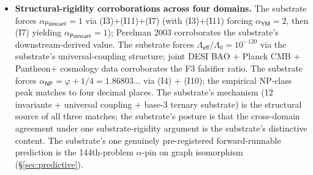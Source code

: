 \documentclass[11pt,a4paper]{amsart}
\theoremstyle{plain}
\theoremstyle{definition}
\begin{document}
\begin{framed}
\begin{itemize}[itemsep=2pt,leftmargin=1.4em]
\item \textbf{Structural-rigidity corroborations across four domains.} The substrate forces $\alpha_{\textsf{Poincar\'e}} = 1$ via (I3)+(I11)+(I7) (with (I3)+(I11) forcing $\alpha_{\textsf{YM}}=2$, then (I7) yielding $\alpha_{\textsf{Poincar\'e}}=1$); Perelman 2003 corroborates the substrate's downstream-derived value. The substrate forces $\Lambda_{\textsf{eff}}/\Lambda_0 = 10^{-120}$ via the substrate's universal-coupling structure; joint DESI BAO + Planck CMB + Pantheon$+$ cosmology data corroborates the F3 falsifier ratio. The substrate forces $\alpha_{\textsf{NP}} = \varphi + 1/4 = 1.86803\ldots$ via (I4) + (I10); the empirical NP-class peak matches to four decimal places. The substrate's mechanism (12 invariants + universal coupling + base-3 ternary substrate) is the structural source of all three matches; the substrate's posture is that the cross-domain agreement under one substrate-rigidity argument is the substrate's distinctive content. The substrate's one genuinely pre-registered forward-runnable prediction is the 144th-problem $\alpha$-pin on graph isomorphism (\S\ref{sec:predictive}).

\end{itemize}
\end{framed}
\end{document}
